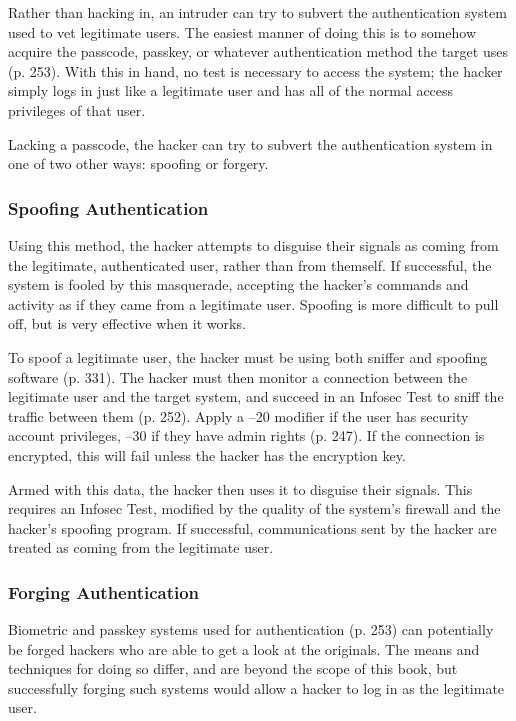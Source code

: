 Rather than hacking in, an intruder can try to subvert the authentication system used to vet legitimate users. The easiest manner of doing this is to somehow acquire the passcode, passkey, or whatever authentication method the target uses (p. 253). With this in hand, no test is necessary to access the system; the hacker simply logs in just like a legitimate user and has all of the normal access privileges of that user. 

Lacking a passcode, the hacker can try to subvert the authentication system in one of two other ways: spoofing or forgery. 

\subsubsection{Spoofing Authentication} 

Using this method, the hacker attempts to disguise their signals as coming from the legitimate, authenticated user, rather than from themself. If successful, the system is fooled by this masquerade, accepting the hacker's commands and activity as if they came from a legitimate user. Spoofing is more difficult to pull off, but is very effective when it works. 

To spoof a legitimate user, the hacker must be using both sniffer and spoofing software (p. 331). The hacker must then monitor a connection between the legitimate user and the target system, and succeed in an Infosec Test to sniff the traffic between them (p. 252). Apply a –20 modifier if the user has security account privileges, –30 if they have admin rights (p. 247). If the connection is encrypted, this will fail unless the hacker has the encryption key. 

Armed with this data, the hacker then uses it to disguise their signals. This requires an Infosec Test, modified by the quality of the system's firewall and the hacker's spoofing program. If successful, communications sent by the hacker are treated as coming from the legitimate user. 

\subsubsection{Forging Authentication} 

Biometric and passkey systems used for authentication (p. 253) can potentially be forged hackers who are able to get a look at the originals. The means and techniques for doing so differ, and are beyond the scope of this book, but successfully forging such systems would allow a hacker to log in as the legitimate user. 

